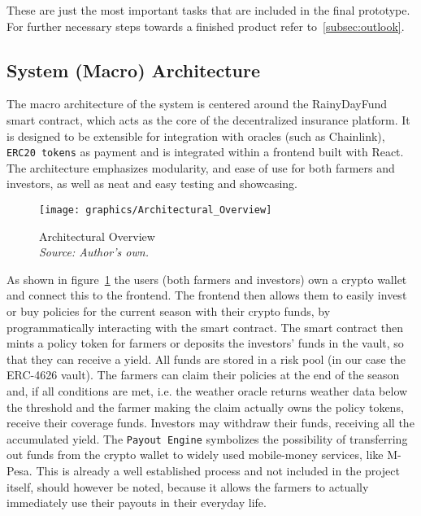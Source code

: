 \documentclass[11pt,a4paper]{article}
\begin{document}
		These are just the most important tasks that are included in the final prototype.
		For further necessary steps towards a finished product refer to~\ref{subsec:outlook}.


		\subsection{System (Macro) Architecture}\label{subsec:system-architecture}
		The macro architecture of the system is centered around the RainyDayFund smart contract, which acts as the core of the decentralized insurance platform.
		It is designed to be extensible for integration with oracles (such as Chainlink), \texttt{ERC20 tokens} as payment and is integrated within a frontend built with React.
		The architecture emphasizes modularity, and ease of use for both farmers and investors, as well as neat and easy testing and showcasing.

		\begin{figure}[htbp]
			\centering
			\texttt{[image: graphics/Architectural\_Overview]}
			\caption{Architectural Overview \\ \textit{Source: Author's own.}}
			\label{fig:architecture}
		\end{figure}

		As shown in figure~\ref{fig:architecture} the users (both farmers and investors) own a crypto wallet and connect this to the frontend.
		The frontend then allows them to easily invest or buy policies for the current season with their crypto funds, by programmatically interacting with the smart contract.
		The smart contract then mints a policy token for farmers or deposits the investors' funds in the vault, so that they can receive a yield.
		All funds are stored in a risk pool (in our case the ERC-4626 vault).
		The farmers can claim their policies at the end of the season and, if all conditions are met, i.e. the weather oracle returns weather data below the threshold and the farmer making the claim actually owns the policy tokens, receive their coverage funds.
		Investors may withdraw their funds, receiving all the accumulated yield.
		The \texttt{Payout Engine} symbolizes the possibility of transferring out funds from the crypto wallet to widely used mobile-money services, like M-Pesa.
		This is already a well established process and not included in the project itself, should however be noted, because it allows the farmers to actually immediately use their payouts in their everyday life.
\end{document}

